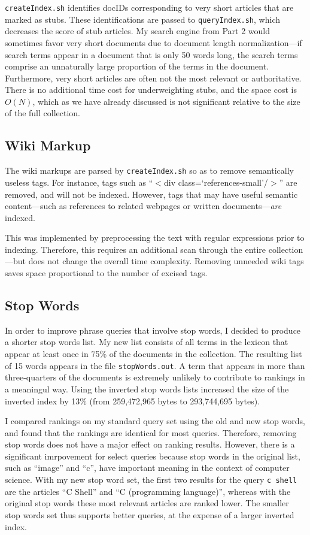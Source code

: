 \documentclass[11pt]{article}
\begin{document}
\texttt{createIndex.sh} identifies docIDs corresponding to very short articles that are marked
as stubs. These identifications are passed to \texttt{queryIndex.sh}, which decreases the score of
stub articles. My search engine from Part 2 would sometimes favor very short documents due to document
length normalization---if search terms appear in a document that is only 50 words long, the search terms
comprise an unnaturally large proportion of the terms in the document. Furthermore, very short articles are often
not the most relevant or authoritative. There is no additional time cost for underweighting stubs, and the space cost is $O(N)$, which as
we have already discussed is not significant relative to the size of the full collection.

\subsection*{Wiki Markup}

The wiki markups are parsed by \texttt{createIndex.sh} so as to remove semantically useless
tags. For instance, tags such as ``$<$div class=`references-small'/$>$'' are removed, and will not be
indexed. However, tags that may have useful semantic content---such as references to related webpages
or written documents---\textit{are} indexed.

This was implemented by preprocessing the text with regular expressions prior to indexing. Therefore,
this requires an additional scan through the entire collection---but does not change the overall
time complexity. Removing unneeded wiki tags saves space proportional to the number of excised tags.

\subsection*{Stop Words}

In order to improve phrase queries that involve stop words, I decided to produce a shorter stop
words list. My new list consists of all terms in the lexicon that appear at least once in 75\% of the
documents in the collection. The resulting list of 15 words appears in the file \texttt{stopWords.out}. A term that appears
in more than three-quarters of the documents is extremely unlikely to contribute to rankings in a meaningul
way. Using the inverted stop words lists increased the size of the inverted index by 13\% (from 259,472,965
bytes to 293,744,695 bytes).

I compared rankings on my standard query set using the old and new stop words, and found that the rankings
 are identical for most queries. Therefore, removing stop words does not have a major effect on ranking results.
However, there is a significant imrpovement for select queries because stop words in the original
list, such as ``image'' and ``c'', have important meaning in the context of computer science. With my new 
stop word set, the first two results for the query \texttt{c shell} are the articles ``C Shell'' and ``C (programming language)'',
whereas with the original stop words these most relevant articles are ranked lower.
The smaller stop words set thus supports better queries, at the expense of a larger
inverted index.
\end{document}
